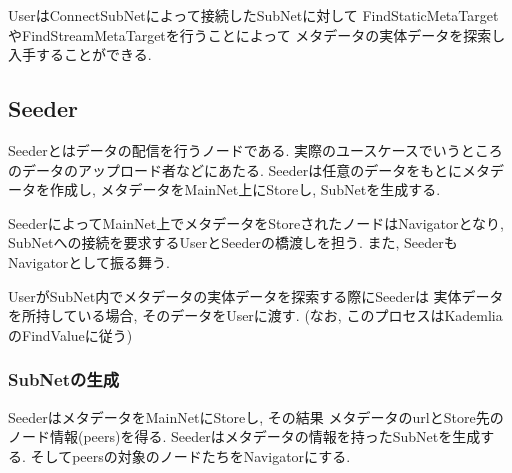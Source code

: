 \documentclass[sotsuron]{jcsie}
\begin{document}
UserはConnectSubNetによって接続したSubNetに対して
FindStaticMetaTargetやFindStreamMetaTargetを行うことによって
メタデータの実体データを探索し入手することができる.

\subsection{Seeder}
Seederとはデータの配信を行うノードである.
実際のユースケースでいうところのデータのアップロード者などにあたる.
Seederは任意のデータをもとにメタデータを作成し, 
メタデータをMainNet上にStoreし, SubNetを生成する.

SeederによってMainNet上でメタデータをStoreされたノードはNavigatorとなり, 
SubNetへの接続を要求するUserとSeederの橋渡しを担う.
また, SeederもNavigatorとして振る舞う.

UserがSubNet内でメタデータの実体データを探索する際にSeederは
実体データを所持している場合, そのデータをUserに渡す.
(なお, このプロセスはKademliaのFindValueに従う)


\subsubsection{SubNetの生成}
SeederはメタデータをMainNetにStoreし, その結果
メタデータのurlとStore先のノード情報(peers)を得る.
Seederはメタデータの情報を持ったSubNetを生成する.
そしてpeersの対象のノードたちをNavigatorにする.
\end{document}
